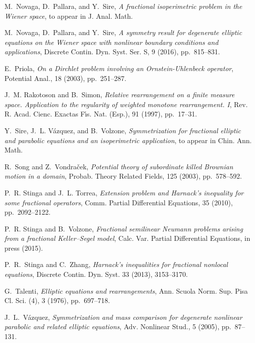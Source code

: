 \documentclass[a4paper,10pt,reqno]{amsart}
\numberwithin{equation}{section}
\begin{document}
\begin{thebibliography}{10}
{\sc M.~Novaga, D.~Pallara, and Y.~Sire}, {\em A fractional isoperimetric
problem in the Wiener space}, to appear in J. Anal. Math.

{\sc M.~Novaga, D.~Pallara, and Y.~Sire}, {\em A symmetry result for degenerate
  elliptic equations on the {W}iener space with nonlinear boundary conditions
  and applications}, Discrete Contin. Dyn. Syst. Ser. S, 9 (2016),
  pp.~815--831.

{\sc E.~Priola}, {\em On a {D}irchlet problem involving an
  {O}rnstein-{U}hlenbeck operator}, Potential Anal., 18 (2003), pp.~251--287.

{\sc J.~M. Rakotoson and B.~Simon}, {\em Relative rearrangement on a finite
  measure space. {A}pplication to the regularity of weighted monotone
  rearrangement. {I}}, Rev. R. Acad. Cienc. Exactas F\'\i s. Nat. (Esp.), 91
  (1997), pp.~17--31.

{\sc Y.~Sire, J.~L. V{\'a}zquez, and B.~Volzone}, {\em \it Symmetrization for
  fractional elliptic and parabolic equations and an isoperimetric
  application}, to appear in Chin. Ann. Math.

{\sc R.~Song and Z.~Vondra\v{c}ek}, {\em Potential theory of subordinate killed Brownian motion in a domain},
Probab. Theory Related Fields, 125 (2003),  pp.~578--592.

{\sc P.~R. Stinga and J.~L. Torrea}, {\em Extension problem and {H}arnack's
  inequality for some fractional operators}, Comm. Partial Differential
  Equations, 35 (2010), pp.~2092--2122.

{\sc P.~R. Stinga and B.~Volzone}, {\em {F}ractional semilinear {N}eumann
  problems arising from a fractional Keller--Segel model}, Calc. Var.
  Partial Differential Equations, in press (2015).

{\sc P.~R.~Stinga and C.~Zhang}, {\em Harnack's inequalities for fractional
nonlocal equations}, Discrete Contin. Dyn. Syst. 33 (2013), 3153--3170.

{\sc G.~Talenti}, {\em Elliptic equations and rearrangements}, Ann. Scuola
  Norm. Sup. Pisa Cl. Sci. (4), 3 (1976), pp.~697--718.

{\sc J.~L.~V\'azquez}, {\em Symmetrization and
  mass comparison for degenerate nonlinear parabolic and related elliptic
  equations}, Adv. Nonlinear Stud., 5 (2005), pp.~87--131.


\end{thebibliography}
\end{document}
